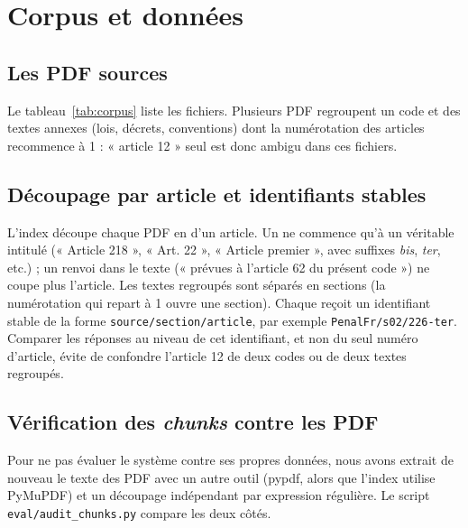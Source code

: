 \section{Corpus et données}\label{sec:corpus}

\subsection{Les PDF sources}
Le tableau~\ref{tab:corpus} liste les fichiers. Plusieurs PDF regroupent un code et des textes annexes (lois, décrets,
conventions) dont la numérotation des articles recommence à 1 : « article 12 » seul est donc ambigu dans ces fichiers.



\subsection{Découpage par article et identifiants stables}
L'index découpe chaque PDF en  d'un article. Un  ne commence qu'à un véritable intitulé
(« Article 218 », « Art. 22 », « Article premier », avec suffixes \emph{bis}, \emph{ter}, etc.) ; un renvoi dans le texte
(« prévues à l'article 62 du présent code ») ne coupe plus l'article. Les textes regroupés sont séparés en sections
(la numérotation qui repart à 1 ouvre une section). Chaque  reçoit un identifiant stable de la forme
\texttt{source/section/article}, par exemple \texttt{PenalFr/s02/226-ter}. Comparer les réponses au niveau de cet
identifiant, et non du seul numéro d'article, évite de confondre l'article 12 de deux codes ou de deux textes regroupés.

\subsection{Vérification des \emph{chunks} contre les PDF}
Pour ne pas évaluer le système contre ses propres données, nous avons extrait de nouveau le texte des PDF avec un autre
outil (pypdf, alors que l'index utilise PyMuPDF) et un découpage indépendant par expression régulière. Le script
\texttt{eval/audit\_chunks.py} compare les deux côtés.

